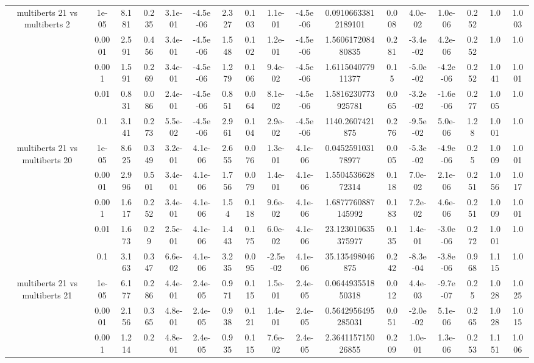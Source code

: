 \begin{tabular}{|c|c|c|c|c|c|c|c|c|c|c|c|c|c|c|c|c|}
\hline
\multirow{5}{*}{multiberts 21 vs multiberts 2} & 1e-05 & 8.181 & 0.235 & 3.1e-01 & -4.5e-06 & 2.327 & 0.103 & 1.1e-01 & -4.5e-06 & 0.09106633812189101 & 0.008 & 4.0e-02 & 1.0e-06 & 0.252 & 1.0 & 1.003 \\
 & 0.0001 & 2.591 & 0.456 & 3.4e-01 & -4.5e-06 & 1.548 & 0.102 & 1.2e-01 & -4.5e-06 & 1.560617208480835 & 0.281 & -3.4e-02 & 4.2e-06 & 0.252 & 1.0 & 1.0 \\
 & 0.001 & 1.591 & 0.269 & 3.4e-01 & -4.5e-06 & 1.279 & 0.106 & 9.4e-02 & -4.5e-06 & 1.611504077911377 & 0.15 & -5.0e-02 & -4.2e-06 & 0.252 & 1.041 & 1.001 \\
 & 0.01 & 0.831 & 0.086 & 2.4e-01 & -4.5e-06 & 0.851 & 0.064 & 8.1e-02 & -4.5e-06 & 1.5816230773925781 & 0.065 & -3.2e-02 & -1.6e-06 & 0.277 & 1.005 & 1.0 \\
 & 0.1 & 3.141 & 0.273 & 5.5e-02 & -4.5e-06 & 2.961 & 0.104 & 2.9e-02 & -4.5e-06 & 1140.2607421875 & 0.276 & -9.5e-02 & 5.0e-06 & 1.28 & 1.001 & 1.0 \\
\hline
\multirow{5}{*}{multiberts 21 vs multiberts 20} & 1e-05 & 8.625 & 0.349 & 3.2e-01 & 4.1e-06 & 2.655 & 0.076 & 1.3e-01 & 4.1e-06 & 0.045259103178977 & 0.005 & -5.3e-02 & -4.9e-06 & 0.25 & 1.009 & 1.001 \\
 & 0.0001 & 2.996 & 0.501 & 3.4e-01 & 4.1e-06 & 1.756 & 0.079 & 1.4e-01 & 4.1e-06 & 1.550453662872314 & 0.118 & 7.0e-02 & 2.1e-06 & 0.251 & 1.056 & 1.017 \\
 & 0.001 & 1.617 & 0.252 & 3.4e-01 & 4.1e-06 & 1.54 & 0.118 & 9.6e-02 & 4.1e-06 & 1.6877760887145992 & 0.183 & 7.2e-02 & 4.6e-06 & 0.251 & 1.009 & 1.001 \\
 & 0.01 & 1.673 & 0.29 & 2.5e-01 & 4.1e-06 & 1.443 & 0.175 & 6.0e-02 & 4.1e-06 & 23.123010635375977 & 0.135 & 1.4e-01 & -3.0e-06 & 0.272 & 1.001 & 1.0 \\
 & 0.1 & 3.163 & 0.347 & 6.6e-02 & 4.1e-06 & 3.235 & 0.095 & -2.5e-02 & 4.1e-06 & 35.135498046875 & 0.242 & -8.3e-04 & -3.8e-06 & 0.968 & 1.115 & 1.0 \\
\hline
\multirow{5}{*}{multiberts 21 vs multiberts 21} & 1e-05 & 6.177 & 0.286 & 4.4e-01 & 2.4e-05 & 0.971 & 0.115 & 1.5e-01 & 2.4e-05 & 0.064493551850318 & 0.012 & 4.4e-03 & -9.7e-07 & 0.25 & 1.028 & 1.025 \\
 & 0.0001 & 2.156 & 0.365 & 4.8e-01 & 2.4e-05 & 0.938 & 0.121 & 1.4e-01 & 2.4e-05 & 0.5642956495285031 & 0.051 & -2.0e-02 & 5.1e-06 & 0.265 & 1.028 & 1.015 \\
 & 0.001 & 1.214 & 0.2 & 4.8e-01 & 2.4e-05 & 0.935 & 0.115 & 7.6e-02 & 2.4e-05 & 2.364115715026855 & 0.209 & 1.0e-01 & 1.3e-06 & 0.253 & 1.151 & 1.006 \\

\end{tabular}
